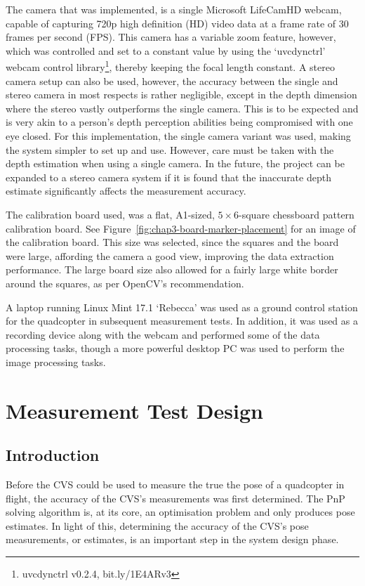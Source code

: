 The camera that was implemented, is a single Microsoft LifeCamHD webcam, capable of capturing 720p high definition (HD) video data at a frame rate of 30 frames per second (FPS). This camera has a variable zoom feature, however, which was controlled and set to a constant value by using the `uvcdynctrl' webcam control library\footnote{uvcdynctrl v0.2.4, bit.ly/1E4ARv3}, thereby keeping the focal length constant. A stereo camera setup can also be used, however, the accuracy between the single and stereo camera in most respects is rather negligible, except in the depth dimension where the stereo vastly outperforms the single camera. This is to be expected and is very akin to a person's depth perception abilities being compromised with one eye closed. For this implementation, the single camera variant was used, making the system simpler to set up and use. However, care must be taken with the depth estimation when using a single camera. In the future, the project can be expanded to a stereo camera system if it is found that the inaccurate depth estimate significantly affects the measurement accuracy.

The calibration board used, was a flat, A1-sized, $5\times6$-square chessboard pattern calibration board. See Figure~\ref{fig:chap3-board-marker-placement} for an image of the calibration board. This size was selected, since the squares and the board were large, affording the camera a good view, improving the data extraction performance. The large board size also allowed for a fairly large white border around the squares, as per OpenCV's recommendation. 

A laptop running Linux Mint 17.1 `Rebecca' was used as a ground control station for the quadcopter in subsequent measurement tests. In addition, it was used as a recording device along with the webcam and performed some of the data processing tasks, though a more powerful desktop PC was used to perform the image processing tasks. 

\section{Measurement Test Design}

\subsection{Introduction}

Before the CVS could be used to measure the true the pose of a quadcopter in flight, the accuracy of the CVS's measurements was first determined. The PnP solving algorithm is, at its core, an optimisation problem and only produces pose estimates. In light of this, determining the accuracy of the CVS's pose measurements, or estimates, is an important step in the system design phase. 

